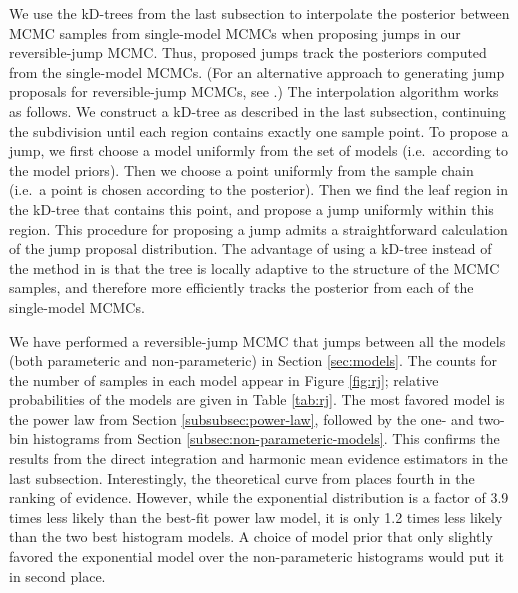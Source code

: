 \documentclass[preprint]{aastex}
\begin{document}
We use the kD-trees from the last subsection to interpolate the
posterior between MCMC samples from single-model MCMCs when proposing
jumps in our reversible-jump MCMC.  Thus, proposed jumps track the
posteriors computed from the single-model MCMCs.  (For an alternative
approach to generating jump proposals for reversible-jump MCMCs, see
\citet{Littenberg2009}.)  The interpolation algorithm works as
follows.  We construct a kD-tree as described in the last subsection,
continuing the subdivision until each region contains exactly one
sample point.  To propose a jump, we first choose a model uniformly
from the set of models (i.e.\ according to the model priors).  Then we
choose a point uniformly from the sample chain (i.e.\ a point is
chosen according to the posterior).  Then we find the leaf region in
the kD-tree that contains this point, and propose a jump uniformly
within this region.  This procedure for proposing a jump admits a
straightforward calculation of the jump proposal distribution.  The
advantage of using a kD-tree instead of the method in
\citet{Littenberg2009} is that the tree is locally adaptive to the
structure of the MCMC samples, and therefore more efficiently tracks
the posterior from each of the single-model MCMCs.

We have performed a reversible-jump MCMC that jumps between all the
models (both parameteric and non-parameteric) in Section
\ref{sec:models}.  The counts for the number of samples in each model
appear in Figure \ref{fig:rj}; relative probabilities of the models
are given in Table \ref{tab:rj}.  The most favored model is the power
law from Section \ref{subsubsec:power-law}, followed by the one-
and two-bin histograms from Section
\ref{subsec:non-parameteric-models}.  This confirms the results from
the direct integration and harmonic mean evidence estimators in the
last subsection.  Interestingly, the theoretical curve from
\citet{Fryer2001} places fourth in the ranking of evidence.  However,
while the exponential distribution is a factor of 3.9 times less
likely than the best-fit power law model, it is only 1.2 times less
likely than the two best histogram models.  A choice of model prior
that only slightly favored the exponential model over the
non-parameteric histograms would put it in second place.
\end{document}
